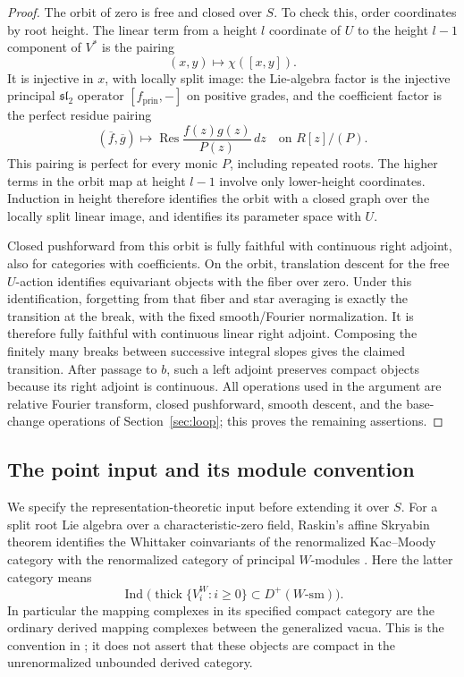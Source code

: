 \documentclass[11pt]{article}
\numberwithin{equation}{section}
\theoremstyle{definition}
\theoremstyle{remark}
\begin{document}
\begin{proof}
The orbit of zero is free and closed over \(S\).  To check this,
order coordinates by root height.  The linear term from a height
\(l\) coordinate of \(U\) to the height \(l-1\) component of
\(V^*\) is the pairing
\[
 (x,y)\longmapsto\chi([x,y]).
\]
It is injective in \(x\), with locally split image: the Lie-algebra
factor is the injective principal \(\mathfrak{sl}_2\) operator
\([f_{\mathrm{prin}},-]\) on positive grades, and the coefficient
factor is the perfect residue pairing
\[
 (\overline f,\overline g)\longmapsto
       \operatorname{Res}\frac{f(z)g(z)}{P(z)}\,dz
       \quad\text{on }R[z]/(P).
\]
This pairing is perfect for every monic \(P\), including repeated
roots.  The higher terms in the orbit map at height \(l-1\) involve
only lower-height coordinates.  Induction in height therefore identifies
the orbit with a closed graph over the locally split linear image,
and identifies its parameter space with \(U\).

Closed pushforward from this orbit is fully faithful with continuous
right adjoint, also for categories with coefficients.  On the orbit,
translation descent for the free \(U\)-action identifies equivariant
objects with the fiber over zero.  Under this identification, forgetting
from that fiber and star averaging is exactly the transition at the
break, with the fixed smooth/Fourier normalization.  It is therefore
fully faithful with continuous linear right adjoint.  Composing the
finitely many breaks between successive integral slopes gives the
claimed transition.  After passage to \(b\), such a left adjoint
preserves compact objects because its right adjoint is continuous.  All operations used in the
argument are relative Fourier transform, closed pushforward, smooth
descent, and the base-change operations of Section~\ref{sec:loop};
this proves the remaining assertions.
\end{proof}

\subsection{The point input and its module convention}

We specify the representation-theoretic input before extending it over
\(S\).  For a split root Lie algebra over a characteristic-zero field,
Raskin's affine Skryabin theorem identifies the Whittaker coinvariants
of the renormalized Kac--Moody category with the renormalized category
of principal \(W\)-modules \cite[Theorem~5.1.1]{RaskinW}.
Here the latter category means
\[
 \operatorname{Ind}\bigl(\operatorname{thick}
       \{V_i^W:i\geq0\}\subset D^+(W\text{-}\mathrm{sm})\bigr).
\]
In particular the mapping complexes in its specified compact category
are the ordinary derived mapping complexes between the generalized
vacua.  This is the convention in \cite[Section~5.1 and the proof of
Theorem~5.1.1]{RaskinW}; it does not assert that these objects are
compact in the unrenormalized unbounded derived category.
\end{document}
